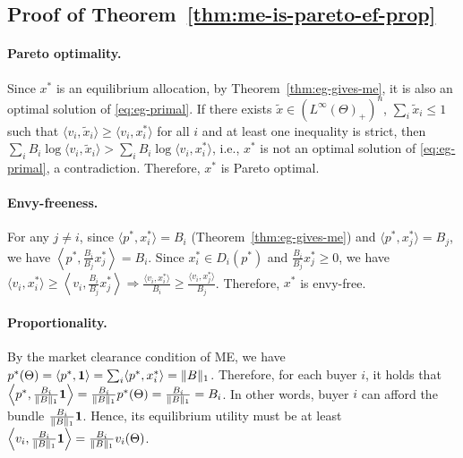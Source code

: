 	\subsection*{Proof of Theorem~\ref{thm:me-is-pareto-ef-prop}}
	\paragraph{Pareto optimality.}
	Since $x^*$ is an equilibrium allocation, by Theorem~\ref{thm:eg-gives-me}, it is also an optimal solution of \eqref{eq:eg-primal}. If there exists $\tilde{x}\in (L^\infty(\Theta)_+)^n$, $\sum_i \tilde{x}_i \leq 1$ such that $\langle v_i, \tilde{x}_i \rangle \geq \langle v_i, x^*_i \rangle$ for all $i$ and at least one inequality is strict, then 
	$\sum_i B_i \log \langle v_i, \tilde{x}_i \rangle > \sum_i B_i \log \langle v_i, x^*_i \rangle$,
	i.e., $x^*$ is not an optimal solution of \eqref{eq:eg-primal}, a contradiction. Therefore, $x^*$ is Pareto optimal.
	
	\paragraph{Envy-freeness.}
	For any $j\neq i$, since $\langle p^*, x^*_i \rangle = B_i$ (Theorem~\ref{thm:eg-gives-me}) and $\langle p^*, x^*_j \rangle = B_j$, we have 
	$ \left \langle p^*, \frac{B_i}{B_j}x^*_j \right \rangle = B_i$.
	Since $x^*_i \in D_i(p^*)$ and $\frac{B_i}{B_j}x^*_j \geq 0$, we have 
	$ \langle v_i, x^*_i \rangle \geq \left\langle v_i, \frac{B_i}{B_j} x^*_j \right \rangle \Rightarrow \frac{\langle v_i, x^*_i \rangle}{B_i} \geq \frac{\langle v_i, x^*_j \rangle}{B_j}$.
	Therefore, $x^*$ is envy-free.
	
	\paragraph{Proportionality.}
	By the market clearance condition of ME, we have
	$ p^*(\Theta) = \langle p^*, \mathbf{1} \rangle = \sum_i \langle p^*, x^*_i\rangle = \|B\|_1$.
	Therefore, for each buyer $i$, it holds that 
	$ \left \langle p^*, \frac{B_i}{\|B\|_1} \mathbf{1} \right \rangle = \frac{B_i}{\|B\|_1} p^*(\Theta) = \frac{B_i}{\|B\|_1} = B_i$.
	In other words, buyer $i$ can afford the bundle $\frac{B_i}{\|B\|_1} \mathbf{1} $. Hence, its equilibrium utility must be at least
	$ \left \langle v_i,\frac{B_i}{\|B\|_1}\mathbf{1} \right\rangle = \frac{B_i}{\|B\|_1}v_i(\Theta)$.
	
